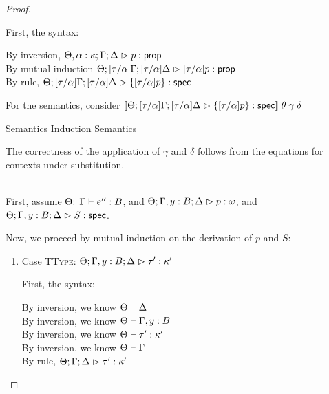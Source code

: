 \begin{proof}
\begin{enumerate}
  First, the syntax:
  \begin{tabbedproof}
    \oo By inversion, $\judgeA[\Theta, \alpha:\kappa; \Gamma; \Delta]{p}{\assert}$ \\
    \oo By mutual induction $\judgeA[\Theta; {[\tau/\alpha]}\Gamma; {[\tau/\alpha]}\Delta]{{[\tau/\alpha]}p}{\assert}$\\
    \oo By rule, $\judgeS[\Theta; {[\tau/\alpha]}\Gamma; {[\tau/\alpha]}\Delta]{\setof{{[\tau/\alpha]}p}}$
  \end{tabbedproof}

  For the semantics, consider $\interp{\judgeS[\Theta; {[\tau/\alpha]}\Gamma; {[\tau/\alpha]}\Delta]{\setof{{[\tau/\alpha]}p}}}\;\theta\;\gamma\;\delta$ 
  \begin{eqnproof}
          {Semantics}
          {Induction}
          {Semantics}
  \end{eqnproof}
  The correctness of the application of $\gamma$ and $\delta$ follows from the equations for
  contexts under substitution. 
\end{enumerate}

\ \\

First, assume $\judgeE{\Gamma}{e''}{B}$, and $\judgeA[\Theta; \Gamma, y:B;\Delta]{p}{\omega}$, and
$\judgeS[\Theta; \Gamma, y:B; \Delta]{S}$. 

Now, we proceed by mutual induction on the derivation of $p$ and $S$: 
\begin{enumerate}

\item Case \textsc{TType}: $\judgeA[\Theta; \Gamma, y:B;\Delta]{\tau'}{\kappa'}$

  First, the syntax:
  \begin{tabbedproof}
    \oo By inversion, we know $\judgectx{\Theta}{\Delta}$ \\
    \oo By inversion, we know $\judgectx{\Theta}{\Gamma, y:B}$ \\
    \oo By inversion, we know $\judgeWK[\Theta]{\tau'}{\kappa'}$ \\
    \oo By inversion, we know $\judgectx{\Theta}{\Gamma}$ \\
    \oo By rule, $\judgeA[\Theta; \Gamma;\Delta]{\tau'}{\kappa'}$
  \end{tabbedproof}


\end{enumerate}
\end{proof}

